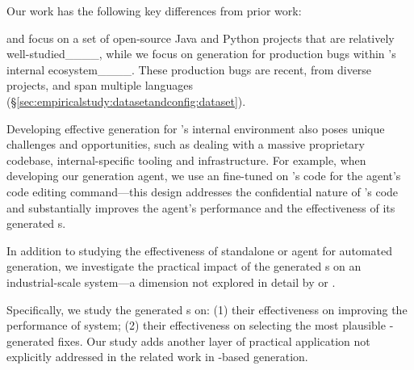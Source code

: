 Our work has the following key differences from prior work:

\libro and \swtbench focus on a set of open-source Java and Python projects that are relatively well-studied____, while we focus on \brt generation for production bugs within \google's internal ecosystem____.
These production bugs are recent, from diverse projects, and span multiple languages (\S\ref{sec:empiricalstudy:datasetandconfig:dataset}).

Developing effective \brt generation for \google's internal environment also poses unique challenges and opportunities, such as dealing with a massive proprietary codebase, internal-specific tooling and infrastructure.
For example, when developing our \brt generation agent, we use an \llm fine-tuned on \google's code for the agent's code editing command---this design addresses the confidential nature of \google's code and substantially improves the agent's performance and the effectiveness of its generated \brt{}s.


In addition to studying the effectiveness of standalone \llm or \llm agent for automated \brt generation, we investigate the practical impact of the generated \brt{}s on an industrial-scale \autopr system---a dimension not explored in detail by \libro or \swtbench.

Specifically, we study the generated \brt{}s on: (1) their effectiveness on improving the performance of \autopr system; (2) their effectiveness on selecting the most plausible \autopr-generated fixes.
Our study adds another layer of practical application not explicitly addressed in the related work in \llm-based \brt generation.